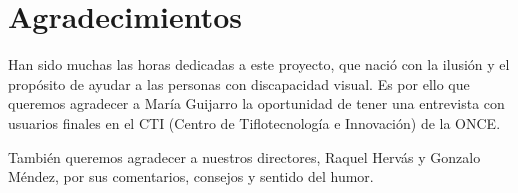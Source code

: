 
\chapter*{Agradecimientos}

Han sido muchas las horas dedicadas a este proyecto, que nació con la ilusión y el propósito de ayudar a las personas con discapacidad visual. Es por ello que queremos agradecer a María Guijarro la oportunidad de tener una entrevista con usuarios finales en el CTI (Centro de Tiflotecnología e Innovación) de la ONCE.

También queremos agradecer a nuestros directores, Raquel Hervás y Gonzalo Méndez, por sus comentarios, consejos y sentido del humor. 












